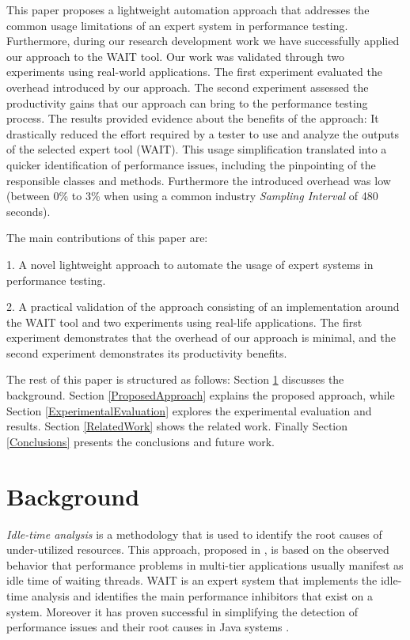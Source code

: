 \documentclass[runningheads,a4paper]{llncs}
\newcommand{\myspaceM}{-7.6pt}
\begin{document}
This paper proposes a lightweight automation approach that addresses the common
usage limitations of an expert system in performance testing. Furthermore,
during our research development work we have successfully applied our approach
to the WAIT tool. Our work was validated through two experiments using
real-world applications. The first experiment evaluated the overhead introduced
by our approach. The second experiment assessed the productivity gains that our approach can bring to the performance
testing process. The results provided evidence about the benefits of the approach: It drastically 
reduced the effort required by a tester to use and analyze the outputs of the
selected expert tool (WAIT). This usage simplification translated into a quicker identification of 
performance issues, including the pinpointing of the responsible classes and
methods. Furthermore the introduced overhead was low (between 0\% to 3\% when
using a common industry \emph{Sampling Interval} of 480 seconds).

The main contributions of this paper are: 

1. A novel lightweight approach to automate the usage of expert systems in
performance testing.

2. A practical validation of the approach consisting of an implementation
around the WAIT tool and two experiments using real-life applications. The first
experiment demonstrates that the overhead of our approach is minimal, and the
second experiment demonstrates its productivity benefits.

The rest of this paper is structured as follows: Section \ref{Background}
discusses the background. Section \ref{ProposedApproach} explains the proposed
approach, while Section \ref{ExperimentalEvaluation} explores the experimental 
evaluation and results. Section \ref{RelatedWork} shows the related work.
Finally Section \ref{Conclusions} presents the conclusions and future work.


\vspace{\myspaceM{}}
\section{Background}
\label{Background}
\vspace{\myspaceM{}}
\emph{Idle-time analysis} is a methodology that is used to identify the root
causes of under-utilized resources. This approach, proposed in
\cite{Altman2010}, is based on the observed behavior that performance problems in multi-tier
applications usually manifest as idle time of waiting threads.
WAIT is an expert system that implements the idle-time analysis and identifies
the main performance inhibitors that exist on a system. Moreover it has proven successful in simplifying the detection of performance issues and their root causes in Java
systems \cite{Altman2010,Wu1}.
\end{document}
